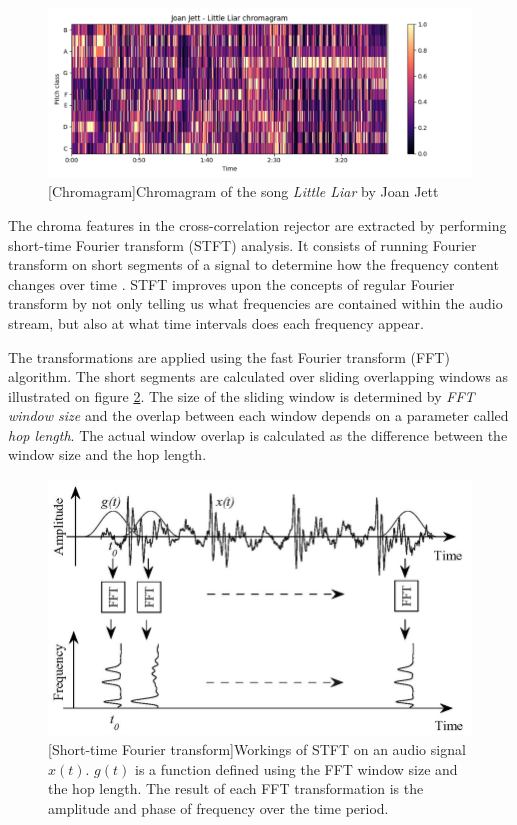\begin{figure}[H]
    \centering
    \includegraphics[width=\textwidth]{Algorithms/chromagram_picture.png}
    [Chromagram]{Chromagram of the song \textit{Little Liar} by Joan Jett}
    \label{fig:chromagram}
\end{figure}

The chroma features in the cross-correlation rejector are extracted by
performing short-time Fourier transform (STFT) analysis. It consists of running
Fourier transform on short segments of a signal to determine how the frequency
content changes over time \cite{gao2006non}. STFT improves upon the concepts of
regular Fourier transform by not only telling us what frequencies are contained
within the audio stream, but also at what time intervals does each frequency
appear.

The transformations are applied using the fast Fourier transform (FFT)
algorithm. The short segments are calculated over sliding overlapping windows as
illustrated on figure \ref{fig:stft}. The size of the sliding window is
determined by \textit{FFT window size} and the overlap between each window
depends on a parameter called \textit{hop length}. The actual window overlap is
calculated as the difference between the window size and the hop length.

\begin{figure}[H]
   \centering 
   \includegraphics[width=\textwidth]{Algorithms/stft.png}
   [Short-time Fourier transform]{Workings of STFT on an audio signal $x(t)$. $g(t)$ is a function defined using the FFT window size and the hop length. The result of each FFT transformation is the amplitude and phase of frequency over the time period. \cite{gao2006non}}
   \label{fig:stft}
\end{figure}

